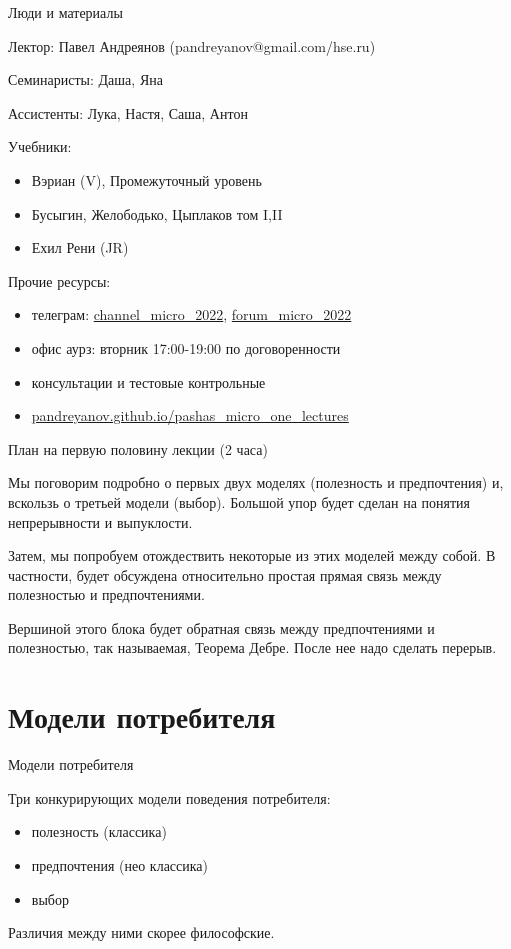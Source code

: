 \documentclass{beamer}
\begin{document}
\begin{frame}{Люди и материалы}

Лектор: Павел Андреянов (pandreyanov@gmail.com/hse.ru)

Семинаристы: Даша, Яна

Ассистенты: Лука, Настя, Саша, Антон

Учебники:
\begin{itemize}
\item Вэриан (V), Промежуточный уровень
\item Бусыгин, Желободько, Цыплаков том I,II
\item Ехил Рени (JR)
\end{itemize}

Прочие ресурсы:
\begin{itemize}
\item телеграм: \url{channel_micro_2022}, \url{forum_micro_2022}
\item офис аурз: вторник 17:00-19:00 по договоренности
\item консультации и тестовые контрольные
\item \url{pandreyanov.github.io/pashas_micro_one_lectures}
\end{itemize}

\end{frame}

\begin{frame}{План на первую половину лекции (2 часа)}

Мы поговорим подробно о первых двух моделях (полезность и предпочтения) и, вскользь о третьей модели (выбор). Большой упор будет сделан на понятия непрерывности и выпуклости.

Затем, мы попробуем отождествить некоторые из этих моделей между собой. В частности, будет обсуждена относительно простая прямая связь между полезностью и предпочтениями.

Вершиной этого блока будет обратная связь между предпочтениями и полезностью, так называемая, Теорема Дебре. После нее надо сделать перерыв.

\end{frame}

\section{Модели потребителя}

\begin{frame}{Модели потребителя}

Три конкурирующих модели поведения потребителя:

\begin{itemize}
\item полезность (классика)
\item предпочтения (нео классика)
\item выбор
\end{itemize}

Различия между ними скорее философские.

\end{frame}
\end{document}

